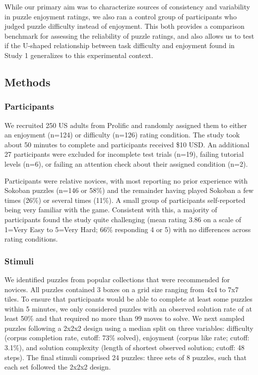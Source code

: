\documentclass[10pt,letterpaper]{article}
\begin{document}
While our primary aim was to characterize sources of consistency and variability in puzzle enjoyment ratings, we also ran a control group of participants who judged puzzle difficulty instead of enjoyment. This both provides a comparison benchmark for assessing the reliability of puzzle ratings, and also allows us to test if the U-shaped relationship between task difficulty and enjoyment found in Study 1 generalizes to this experimental context.

\subsection{Methods}


\subsubsection{Participants}

We recruited 250 US adults from Prolific and randomly assigned them to either an enjoyment (n=124) or difficulty (n=126) rating condition. The study took about 50 minutes to complete and participants received \$10 USD. An additional 27 participants were excluded for incomplete test trials (n=19), failing tutorial levels (n=6), or failing an attention check about their assigned condition (n=2). 

Participants were relative novices, with most reporting no prior experience with Sokoban puzzles (n=146 or 58\%) and the remainder having played Sokoban a few times (26\%) or several times (11\%). A small group of participants self-reported being very familiar with the game. Consistent with this, a majority of participants found the study quite challenging (mean rating 3.86 on a scale of 1=Very Easy to 5=Very Hard; 66\% responding 4 or 5) with no differences across rating conditions.

\subsubsection{Stimuli}

We identified puzzles from popular collections that were recommended for novices. All puzzles contained 3 boxes on a grid size ranging from 4x4 to 7x7 tiles. To ensure that participants would be able to complete at least some puzzles within 5 minutes, we only considered puzzles with an observed solution rate of at least 50\% and that required no more than 99 moves to solve. 
We next sampled puzzles following a 2x2x2 design using a median split on three variables: difficulty (corpus completion rate, cutoff: 73\% solved), enjoyment (corpus like rate; cutoff: 3.1\%), and solution complexity (length of shortest observed  solution; cutoff: 48 steps). The final stimuli comprised 24 puzzles: three sets of 8 puzzles, such that each set followed the 2x2x2 design.
\end{document}
